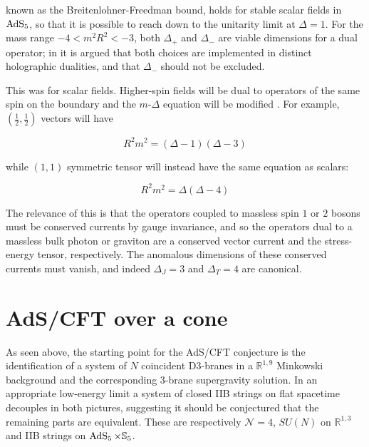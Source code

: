 known as the Breitenlohner-Freedman bound, holds for stable scalar fields in $\operatorname{AdS}_{5}$, so that it is possible to reach down to the unitarity limit at $\Delta = 1$. For the mass range $-4 < m^2 R^2 < -3$, both $\Delta_+$ and $\Delta_-$ are viable dimensions for a dual operator; in \cite{KW_SB} it is argued that both choices are implemented in distinct holographic dualities, and that $\Delta_-$ should not be excluded.


This was for scalar fields. Higher-spin fields will be dual to operators of the same spin on the boundary and the $m$-$\Delta$ equation will be modified \cite{lezionilosanna}. For example, $(\frac{1}{2},\frac{1}{2})$ vectors will have

\begin{equation}
	R^2 m^2 = (\Delta-1)(\Delta-3)
	\label{}
\end{equation}

while $(1,1)$ symmetric tensor will instead have the same equation as scalars:

\begin{equation}
	R^2 m^2 = \Delta (\Delta-4)
	\label{}
\end{equation}

The relevance of this is that the operators coupled to massless spin $1$ or $2$ bosons must be conserved currents by gauge invariance, and so the operators dual to a massless bulk photon or graviton are a conserved vector current and the stress-energy tensor, respectively. The anomalous dimensions of these conserved currents must vanish, and indeed $\Delta_J = 3$ and $\Delta_T = 4$ are canonical.

\section{AdS/CFT over a cone}

As seen above, the starting point for the AdS/CFT conjecture is the identification of a system of $N$ coincident D3-branes in a $\mathbb{R}^{1,9}$ Minkowski background and the corresponding 3-brane supergravity solution. In an appropriate low-energy limit a system of closed IIB strings on flat spacetime decouples in both pictures, suggesting it should be conjectured that the remaining parts are equivalent. These are respectively $\mathcal{N}=4$, $SU(N)$ \SYM on $\mathbb{R}^{1,3}$ and IIB strings on $\operatorname{AdS}_{5} \times \mathbb{S}_5$.


